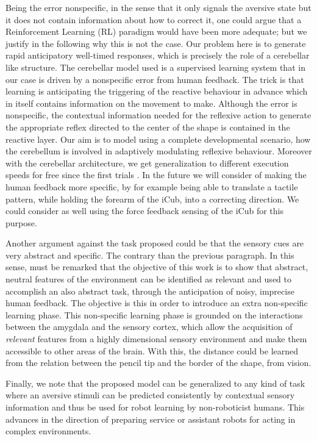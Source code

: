 \documentclass[letterpaper, 10 pt, conference]{ieeeconf}  %
\begin{document}
Being the error nonspecific, in the sense that it only signals the aversive state but it does not contain information about how to correct it, one could argue that a Reinforcement Learning (RL) paradigm would have been more adequate; but we justify in the following why this is not the case. Our problem here is to generate rapid anticipatory well-timed responses, which is precisely the role of a cerebellar like structure.
The cerebellar model used \cite{herreros2013nucleo} is a supervised learning system that in our case is driven by a nonspecific error from human feedback. The trick is that learning is anticipating the triggering of the reactive behaviour in advance which in itself contains information on the movement to make. Although the error is nonspecific, the contextual information needed for the reflexive action to generate the appropriate reflex directed to the center of the shape is contained in the reactive layer. Our aim is to model using a complete developmental scenario, how the cerebellum is involved in adaptively modulating reflexive behaviour. Moreover with the cerebellar architecture, we get generalization to different execution speeds for free since the first trials \cite{herreros2013speed}.  
In the future we will consider of making the human feedback more specific, by for example being able to translate a tactile pattern, while holding the forearm of the iCub, into a correcting direction. We could consider as well using the force feedback sensing of the iCub for this purpose.

Another argument against the task proposed could be that the sensory cues are very abstract and specific. The contrary than the previous paragraph. In this sense, must be remarked that the objective of this work is to show that abstract, neutral features of the environment can be identified as relevant and used to accomplish an also abstract task, through the anticipation of noisy, imprecise human feedback. The objective is this in order to introduce an extra non-specific learning phase. This non-specific learning phase is grounded on the interactions between the amygdala and the sensory cortex, which allow the acquisition of \emph{relevant} features from a highly dimensional sensory environment and make them accessible to other areas of the brain. With this, the distance could be learned from the relation between the pencil tip and the border of the shape, from vision. 

Finally, we note that the proposed model can be generalized to any kind of task where an aversive stimuli can be predicted consistently by contextual sensory information and thus be used for robot learning by non-roboticist humans. This advances in the direction of preparing service or assistant robots for acting in complex environments. 
\end{document}
